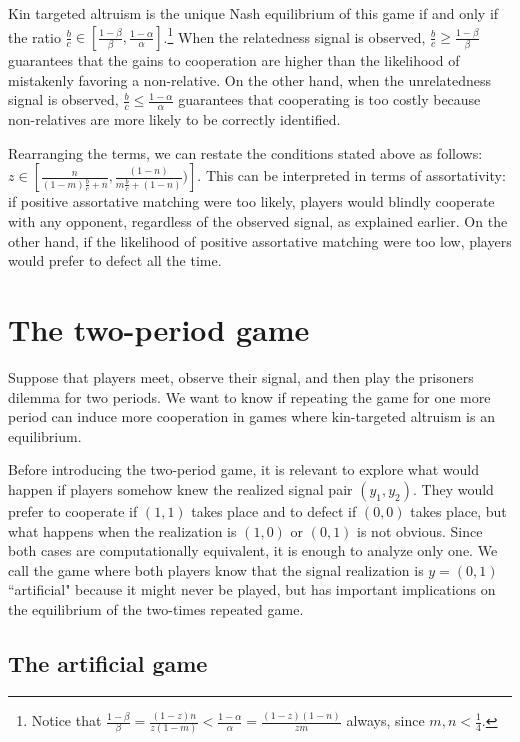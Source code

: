 \documentclass[12pt]{article}
\begin{document}
Kin targeted altruism is the unique Nash equilibrium of this game if and only if the ratio $\frac{b}{c} \in [\frac{1-\beta}{\beta},\frac{1- \alpha}{\alpha}]$.\footnote{Notice that $\frac{1-\beta}{\beta}=\frac{(1-z)n}{z(1-m)}< \frac{1-\alpha}{\alpha}=\frac{(1-z)(1-n)}{zm}$ always, since $m,n< \frac{1}{4}$.} When the relatedness signal is observed, $\frac{b}{c} \geq \frac{1- \beta}{\beta}$ guarantees that the gains to cooperation are higher than the likelihood of mistakenly favoring a non-relative. On the other hand, when the unrelatedness signal is observed, $ \frac{b}{c}\leq \frac{1- \alpha}{\alpha}$ guarantees that cooperating is too costly because non-relatives are more likely to be correctly identified. 

Rearranging the terms, we can restate the conditions stated above as follows: $z\in [\frac{n}{(1-m)\frac{b}{c}+n},\frac{(1-n)}{m\frac{b}{c}+(1-n)})]$. This can be interpreted in terms of assortativity: if positive assortative matching were too likely, players would blindly cooperate with any opponent, regardless of the observed signal, as explained earlier. On the other hand, if the likelihood of positive assortative matching were too low, players would prefer to defect all the time.

\section{The two-period game}

Suppose that players meet, observe their signal, and then play the prisoners dilemma for two periods. We want to know if repeating the game for one more period can induce more cooperation in games where kin-targeted altruism is an equilibrium.

Before introducing the two-period game, it is relevant to explore what would happen if players somehow knew the realized signal pair $(y_{1},y_{2})$. They would prefer to cooperate if $(1,1)$ takes place and to defect if $(0,0)$ takes place, but what happens when the realization is $(1,0)$ or $(0,1)$ is not obvious. Since both cases are computationally equivalent, it is enough to analyze only one. We call the game where both players know that the signal realization is $y=(0,1)$ ``artificial" because it might never be played, but has important implications on the equilibrium of the two-times repeated game.

\subsection{The artificial game}
\end{document}
